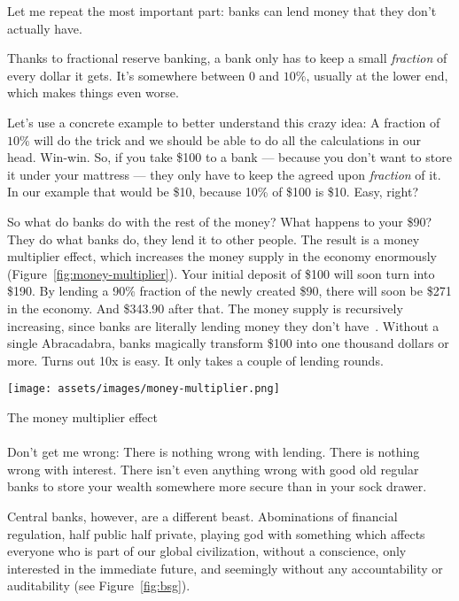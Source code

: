 Let me repeat the most important part: banks can lend money that they
don't actually have.

Thanks to fractional reserve banking, a bank only has to keep a small
\textit{fraction} of every dollar it gets. It's somewhere between $0$ and $10\%$,
usually at the lower end, which makes things even worse.

Let's use a concrete example to better understand this crazy idea: A
fraction of $10\%$ will do the trick and we should be able to do all the
calculations in our head. Win-win. So, if you take \$100 to a
bank --- because you don't want to store it under your mattress --- they
only have to keep the agreed upon \textit{fraction} of it. In our example that
would be \$10, because 10\% of \$100 is \$10. Easy, right?

So what do banks do with the rest of the money? What happens to your \$90? They
do what banks do, they lend it to other people. The result is a money multiplier
effect, which increases the money supply in the economy enormously
(Figure~\ref{fig:money-multiplier}). Your initial deposit of \$100 will soon
turn into \$190. By lending a 90\% fraction of the newly created \$90, there
will soon be \$271 in the economy. And \$343.90 after that. The money supply is
recursively increasing, since banks are literally lending money they don't
have~\cite{wiki:money-multiplier}. Without a single Abracadabra, banks magically
transform \$100 into one thousand dollars or more. Turns out 10x is easy. It
only takes a couple of lending rounds.

\begin{center}
  \centering
  \texttt{[image: assets/images/money-multiplier.png]}
  \caption{The money multiplier effect}
  \label{fig:money-multiplier}
\end{center}

\paragraph{}
Don't get me wrong: There is nothing wrong with lending. There is
nothing wrong with interest. There isn't even anything wrong with good
old regular banks to store your wealth somewhere more secure than in
your sock drawer.

Central banks, however, are a different beast. Abominations of financial
regulation, half public half private, playing god with something which
affects everyone who is part of our global civilization, without a
conscience, only interested in the immediate future, and seemingly
without any accountability or auditability (see Figure~\ref{fig:bsg}).

